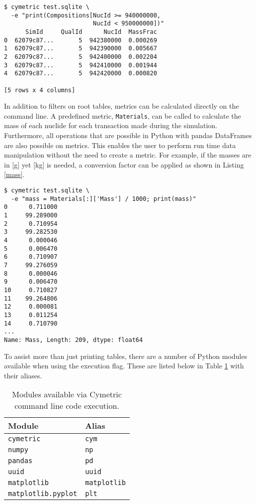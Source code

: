 \documentclass{anstrans}
\newcommand{\code}[1]{{\color{code}\texttt{#1}}}
\begin{document}
\begin{lstlisting}[caption ={Filtering a Root Table in a Database}, label=pu]
$ cymetric test.sqlite \
  -e "print(Compositions[NucId >= 940000000, 
                         NucId < 950000000])"
      SimId     QualId      NucId  MassFrac
0  62079c87...       5  942380000  0.000269
1  62079c87...       5  942390000  0.005667
2  62079c87...       5  942400000  0.002204
3  62079c87...       5  942410000  0.001944
4  62079c87...       5  942420000  0.000820

[5 rows x 4 columns]
\end{lstlisting}

In addition to filters on root tables, metrics can  be calculated directly 
on the command line. A predefined metric, \code{Materials}, can be called 
to calculate the mass of each nuclide for each transaction made during 
the simulation. Furthermore, all operations that are possible in Python 
with pandas DataFrames are also possible on metrics.  This enables the user
to perform run time data manipulation without the need to create a metric.
For example, if the masses are in [g] yet [kg] is needed, 
a conversion factor can be applied as shown in Listing \ref{mass}.

\begin{lstlisting}[caption ={Calculating and Manipulating Metrics}, label=mass]
$ cymetric test.sqlite \
  -e "mass = Materials[:]['Mass'] / 1000; print(mass)"
0      0.711000
1     99.289000
2      0.710954
3     99.282530
4      0.000046
5      0.006470
6      0.710907
7     99.276059
8      0.000046
9      0.006470
10     0.710827
11    99.264806
12     0.000081
13     0.011254
14     0.710790
...
Name: Mass, Length: 209, dtype: float64
\end{lstlisting}

To assist more than just printing tables, there are a number of Python 
modules available when using the execution flag. These are listed below 
in Table \ref{tab:modules} with their aliases.

\begin{table}[htb]
  \centering
\begin{tabular}{ll}
\toprule
  Module                   & Alias \\
\midrule
  \code{cymetric}          & \code {cym} \\
  \code{numpy}             & \code{np} \\  
  \code{pandas}            & \code{pd} \\
  \code{uuid}              & \code{uuid} \\
  \code{matplotlib}        & \code{matplotlib} \\
  \code{matplotlib.pyplot} & \code{plt} \\
\bottomrule
\end{tabular}
  \caption{Modules available via Cymetric command line code execution.}
  \label{tab:modules}
\end{table}
\end{document}
